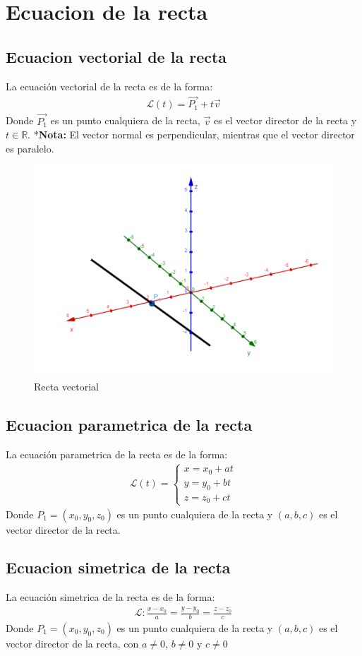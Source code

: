 \documentclass{templateNote}
\begin{document}
\newpage
\section{Ecuacion de la recta}
\subsection{Ecuacion vectorial de la recta}
\indent
La ecuación vectorial de la recta es de la forma:
\begin{align*}
    \mathcal{L}(t) = \overrightarrow{P_1} + t\overrightarrow{v}
\end{align*}
Donde $\overrightarrow{P_1}$ es un punto cualquiera de la recta, $\overrightarrow{v}$ es el vector director de la recta y $t \in \mathbb{R}$.
*\textbf{Nota:} El vector normal es perpendicular, mientras que el vector director es paralelo.

\begin{figure}[H]
    \centering
    \includegraphics[width=0.6\linewidth]{img/Recta1.png}
    \caption{Recta vectorial}
\end{figure}

\subsection{Ecuacion parametrica de la recta}
\indent
La ecuación parametrica de la recta es de la forma:
\begin{align*}
    \mathcal{L}(t) = \begin{cases}
        x = x_0 + at \\
        y = y_0 + bt \\
        z = z_0 + ct
    \end{cases}
\end{align*}
Donde $P_1 = (x_0, y_0, z_0)$ es un punto cualquiera de la recta y $(a, b, c)$ es el vector director de la recta.

\subsection{Ecuacion simetrica de la recta}
\indent
La ecuación simetrica de la recta es de la forma:
\begin{align*}
    \mathcal{L} : \frac{x - x_0}{a} = \frac{y - y_0}{b} = \frac{z - z_0}{c}
\end{align*}
Donde $P_1 = (x_0, y_0, z_0)$ es un punto cualquiera de la recta y $(a, b, c)$ es el vector director de la recta, con $a \neq 0$, $b \neq 0$ y $c \neq 0$ 
\end{document}

